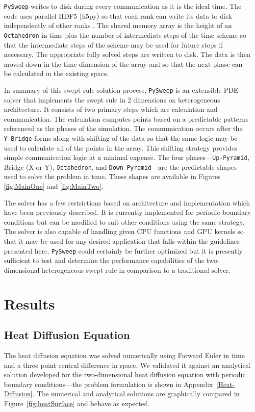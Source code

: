 \documentclass[journal,article,submit,moreauthors,pdftex]{Definitions/mdpi}
\def\pysweep{\texttt{PySweep}}
\def\Up{\texttt{Up-Pyramid}}
\def\Down{\texttt{Down-Pyramid}}
\def\Oct{\texttt{Octahedron}}
\def\Yb{\texttt{Y-Bridge}}
\begin{document}
\begin{paracol}{2}
\par \pysweep{} writes to disk during every communication as it is the ideal time. The code uses parallel HDF5 (h5py) so that each rank can write its data to disk independently of other ranks \cite{Collette2008HDF5Python}. The shared memory array is the height of an \Oct{} in time plus the number of intermediate steps of the time scheme so that the intermediate steps of the scheme may be used for future steps if necessary. The appropriate fully solved steps are written to disk. The data is then moved down in the time dimension of the array and so that the next phase can be calculated in the existing space.

\par
In summary of this swept rule solution process, \pysweep{} is an extensible PDE solver that implements the swept rule in 2 dimensions on heterogeneous architecture. It consists of two primary steps which are calculation and communication. The calculation computes points based on a predictable patterns referenced as the phases of the simulation. The communication occurs after the \Yb{} forms along with shifting of the data so that the same logic may be used to calculate all of the points in the array. This shifting strategy provides simple communication logic at a minimal expense. The four phases---\Up{}, Bridge (X or Y), \Oct{}, and \Down{}---are the predictable shapes used to solve the problem in time. These shapes are available in Figures \ref{fig:MainOne} and \ref{fig:MainTwo}. 
\par
The solver has a few restrictions based on architecture and implementation which have been previously described. It is currently implemented for periodic boundary conditions but can be modified to suit other conditions using the same strategy. The solver is also capable of handling given CPU functions and GPU kernels so that it may be used for any desired application that falls within the guidelines presented here. \pysweep{} could certainly be further optimized but it is presently sufficient to test and determine the performance capabilities of the two-dimensional heterogeneous swept rule in comparison to a traditional solver.

\section{Results}
\label{results-section}

\subsection{Heat Diffusion Equation}
\label{hdeResults}
The heat diffusion equation was solved numerically using Forward Euler in time and a three point central difference in space. We validated it against an analytical solution developed for the two-dimensional heat diffusion equation with periodic boundary conditions---the problem formulation is shown in Appendix~\ref{Heat-Diffusion}. The numerical and analytical solutions are graphically compared in Figure~\ref{fig:heatSurface} and behave as expected.

\end{paracol}
\end{document}
